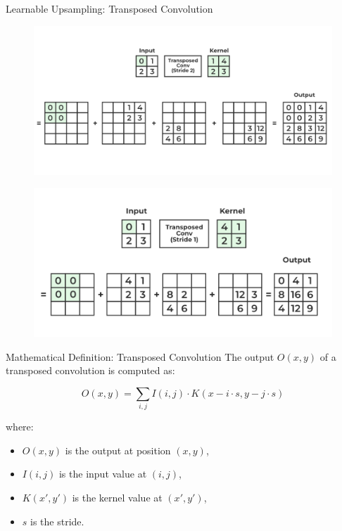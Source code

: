 \documentclass[10pt]{beamer}
\theoremstyle{remark}
\theoremstyle{definition}
\begin{document}
\begin{frame}[allowframebreaks]{Learnable Upsampling: Transposed Convolution}
\begin{figure}
\centering
\includegraphics[width=1.0\textwidth,height=1.0\textheight,keepaspectratio]{./images/TConv.png}
\end{figure}

\begin{figure}
\centering
\includegraphics[width=1.0\textwidth,height=1.0\textheight,keepaspectratio]{./images/TConv2.png}
\end{figure}

\end{frame}

\begin{frame}{Mathematical Definition: Transposed Convolution}
The output \( O(x, y) \) of a transposed convolution is computed as:

\[
O(x, y) = \sum_{i,j} I(i, j) \cdot K(x - i \cdot s, y - j \cdot s)
\]

where:
\begin{itemize}
    \item \( O(x, y) \) is the output at position \( (x, y) \),
    \item \( I(i, j) \) is the input value at \( (i, j) \),
    \item \( K(x', y') \) is the kernel value at \( (x', y') \),
    \item \( s \) is the stride.
\end{itemize}
\end{frame}
\end{document}

